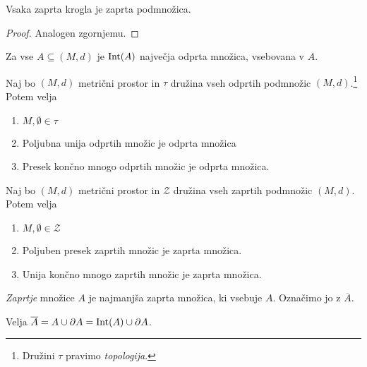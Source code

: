 \documentclass[12pt, a4paper]{article}
\begin{document}
\begin{trditev}
Vsaka zaprta krogla je zaprta podmnožica.
\end{trditev}

\begin{proof}
Analogen zgornjemu.
\end{proof}

\begin{opomba}
Za vse $A\subseteq(M,d)$ je $\operatorname{Int}(A)$ največja odprta množica, vsebovana v $A$.
\end{opomba}

\begin{izrek}[Topologija]
Naj bo $(M,d)$ metrični prostor in $\tau$ družina vseh odprtih podmnožic $(M,d)$.\footnote{Družini $\tau$ pravimo \emph{topologija}.} Potem velja

\begin{enumerate}[label=\arabic*)]
\item $M,\emptyset\in\tau$
\item Poljubna unija odprtih množic je odprta množica
\item Presek končno mnogo odprtih množic je odprta množica.
\end{enumerate}
\end{izrek}

\obvs

\begin{posledica}
Naj bo $(M,d)$ metrični prostor in $\mathcal{Z}$ družina vseh zaprtih podmnožic $(M,d)$. Potem velja

\begin{enumerate}[label=\arabic*)]
\item $M,\emptyset\in\mathcal{Z}$
\item Poljuben presek zaprtih množic je zaprta množica.
\item Unija končno mnogo zaprtih množic je zaprta množica.
\end{enumerate}
\end{posledica}

\obvs

\begin{definicija}
\emph{Zaprtje} množice $A$ je najmanjša zaprta množica, ki vsebuje $A$. Označimo jo z $\overline{A}$.
\end{definicija}

\begin{trditev}
Velja $\overline{A}=A\cup\partial A=\operatorname{Int}(A)\cup\partial A$.
\end{trditev}
\end{document}
